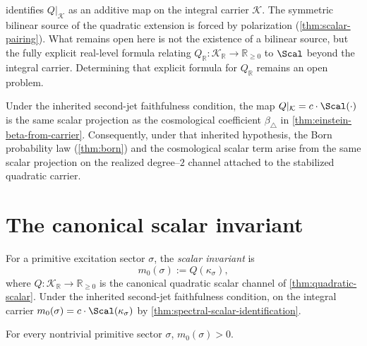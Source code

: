 \begin{remark}
\label{rem:spectral-scalar-id-scope}
 identifies $Q|_{\mathcal K}$
as an additive map on the integral carrier $\mathcal K$.
The symmetric bilinear source of the quadratic extension is forced by
polarization (\cref{thm:scalar-pairing}).  What remains open here is not
the existence of a bilinear source, but the fully explicit real-level formula
relating
$Q_{\mathbb R} : \mathcal K_{\mathbb R} \to \mathbb R_{\geq 0}$
to $\Scal$ beyond the integral carrier.  Determining that explicit formula
for $Q_{\mathbb R}$ remains an open problem.
\end{remark}

\begin{remark}
\label{rem:spectral-cosmological}
Under the inherited second-jet faithfulness condition, the map
$Q|_{\mathcal K} = c \cdot \Scal(\cdot)$
is the same scalar projection as the cosmological coefficient
$\beta_\triangle$ in \cref{thm:einstein-beta-from-carrier}.
Consequently, under that inherited hypothesis, the Born probability
law (\cref{thm:born}) and the cosmological scalar term arise from the
same scalar projection on the realized degree--\(2\) channel attached
to the stabilized quadratic carrier.
\end{remark}

\section{The canonical scalar invariant}
\label{sec:spectral-scalar}

\begin{definition}
\label{def:spectral-scalar}
For a primitive excitation sector $\sigma$, the \emph{scalar invariant} is
\[
  m_0(\sigma) := Q(\kappa_\sigma),
\]
where $Q : \mathcal K_{\mathbb R} \to \mathbb R_{\geq 0}$ is the
canonical quadratic scalar channel of \cref{thm:quadratic-scalar}.
Under the inherited second-jet faithfulness condition, on the integral
carrier
$m_0(\sigma) = c \cdot \Scal(\kappa_\sigma)$
by \cref{thm:spectral-scalar-identification}.
\end{definition}

\begin{theorem}
\label{thm:spectral-scalar-positive}
For every nontrivial primitive sector $\sigma$, $m_0(\sigma) > 0$.
\end{theorem}

